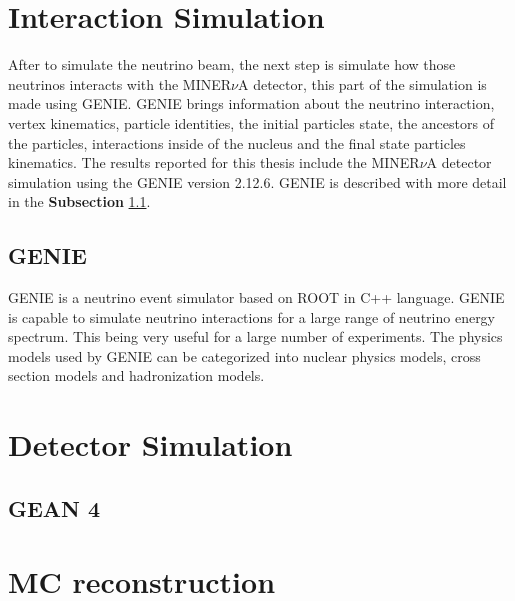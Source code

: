 \section{Interaction Simulation}
\label{Cap:Simulation:InteractionSimulation}

After to simulate the neutrino beam, the next step is simulate how those neutrinos interacts with the MINER$\nu$A detector, this part of the simulation is made using GENIE\cite{Genie}. GENIE brings information about the neutrino interaction, vertex kinematics, particle identities, the initial particles state, the ancestors of the particles, interactions inside of the nucleus and the final state particles kinematics. The results reported for this thesis include the MINER$\nu$A detector  simulation using the GENIE version 2.12.6. GENIE is described with more detail in the \textbf{Subsection} \ref{Cap:Simulation:GENIE}.

\subsection{GENIE}
\label{Cap:Simulation:GENIE}
GENIE is a neutrino event simulator based on ROOT in C++ language. GENIE is capable to simulate neutrino interactions for a large range of neutrino energy spectrum. This being very useful for a large number of experiments. The physics models used by GENIE can be categorized into nuclear physics models, cross section models and hadronization models.






\section{Detector Simulation}
\label{Cap:Simulation:DetectorSimulation}

\subsection{GEAN 4}
\label{Cap:Simulation:GEANT4}

\section{MC reconstruction}
\label{Cap:Simulation:MCReconstruction}




